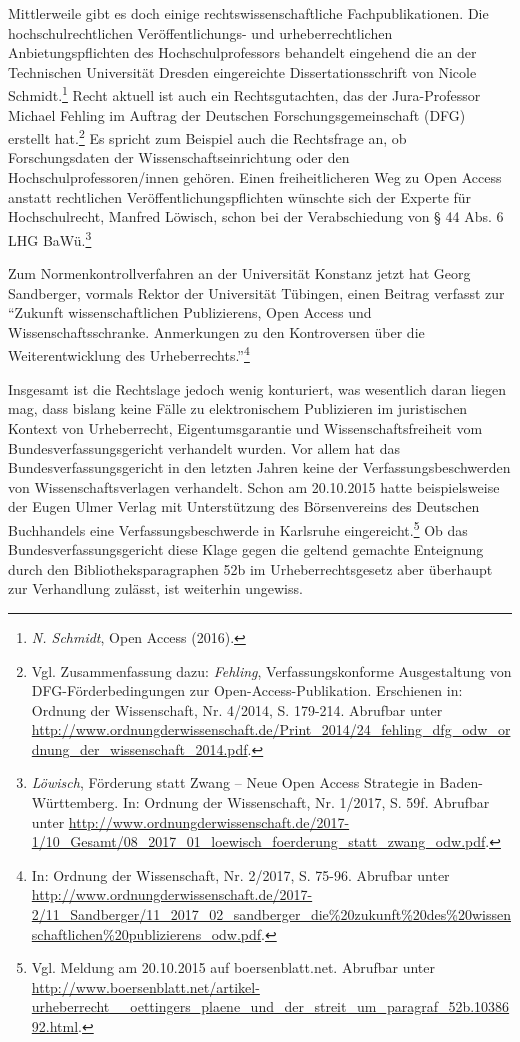 \documentclass[a4paper,
fontsize=11pt,
oneside,
numbers=noperiodatend,
parskip=half-,
bibliography=totoc,
final
]{scrartcl}
\begin{document}
Mittlerweile gibt es doch einige rechtswissenschaftliche
Fachpublikationen. Die hochschulrechtlichen Veröffentlichungs- und
urheberrechtlichen Anbietungspflichten des Hochschulprofessors behandelt
eingehend die an der Technischen Universität Dresden eingereichte
Dissertationsschrift von Nicole Schmidt.\footnote{\emph{N. Schmidt},
  Open Access (2016).} Recht aktuell ist auch ein Rechtsgutachten, das
der Jura-Professor Michael Fehling im Auftrag der Deutschen
Forschungsgemeinschaft (DFG) erstellt hat.\footnote{Vgl. Zusammenfassung
  dazu: \emph{Fehling}, Verfassungskonforme Ausgestaltung von
  DFG-Förderbedingungen zur Open-Access-Pub\-li\-ka\-ti\-on. Erschienen in:
  Ordnung der Wissenschaft, Nr. 4/2014, S. 179-214. Abrufbar unter
  \url{http://www.ordnungderwissenschaft.de/Print_2014/24_fehling_dfg_odw_ordnung_der_wissenschaft_2014.pdf}.}
Es spricht zum Beispiel auch die Rechtsfrage an, ob Forschungsdaten der
Wissenschaftseinrichtung oder den Hochschulprofessoren/innen gehören.
Einen freiheitlicheren Weg zu Open Access anstatt rechtlichen
Veröffentlichungspflichten wünschte sich der Experte für Hochschulrecht,
Manfred Löwisch, schon bei der Verabschiedung von § 44 Abs. 6 LHG
BaWü.\footnote{\emph{Löwisch}, Förderung statt Zwang -- Neue Open Access
  Strategie in Baden-Württemberg. In: Ordnung der Wissenschaft, Nr.
  1/2017, S. 59f. Abrufbar unter
  \url{http://www.ordnungderwissenschaft.de/2017-1/10_Gesamt/08_2017_01_loewisch_foerderung_statt_zwang_odw.pdf}.}

Zum Normenkontrollverfahren an der Universität Konstanz jetzt hat Georg
Sandberger, vormals Rektor der Universität Tübingen, einen Beitrag
verfasst zur \enquote{Zukunft wissenschaftlichen Publizierens, Open
Access und Wissenschaftsschranke. Anmerkungen zu den Kontroversen über
die Weiterentwicklung des Urheberrechts.}\footnote{In: Ordnung der
  Wissenschaft, Nr. 2/2017, S. 75-96. Abrufbar unter
  \url{http://www.ordnungderwissenschaft.de/2017-2/11_Sandberger/11_2017_02_sandberger_die\%20zukunft\%20des\%20wissenschaftlichen\%20publizierens_odw.pdf}.}

Insgesamt ist die Rechtslage jedoch wenig konturiert, was wesentlich
daran liegen mag, dass bislang keine Fälle zu elektronischem Publizieren
im juristischen Kontext von Urheberrecht, Eigentumsgarantie und
Wissenschaftsfreiheit vom Bundesverfassungsgericht verhandelt wurden.
Vor allem hat das Bundesverfassungsgericht in den letzten Jahren keine
der Verfassungsbeschwerden von Wissenschaftsverlagen verhandelt. Schon
am 20.10.2015 hatte beispielsweise der Eugen Ulmer Verlag mit
Unterstützung des Börsenvereins des Deutschen Buchhandels eine
Verfassungsbeschwerde in Karlsruhe eingereicht.\footnote{Vgl. Meldung am
  20.10.2015 auf boersenblatt.net. Abrufbar unter
  \url{http://www.boersenblatt.net/artikel-urheberrecht__oettingers_plaene_und_der_streit_um_paragraf_52b.1038692.html}.}
Ob das Bundesverfassungsgericht diese Klage gegen die geltend gemachte
Enteignung durch den Bibliotheksparagraphen 52b im Urheberrechtsgesetz
aber überhaupt zur Verhandlung zulässt, ist weiterhin ungewiss.
\end{document}
